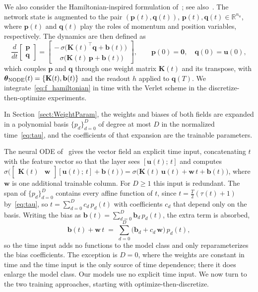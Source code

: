 \documentclass[pdflatex,sn-mathphys-num]{sn-jnl}%
\newcommand{\R}{\mathbb{R}}
\newcommand{\bfu}{\mathbf{u}}
\newcommand{\bfp}{\mathbf{p}}
\newcommand{\bfq}{\mathbf{q}}
\newcommand{\bfb}{\mathbf{b}}
\newcommand{\bfK}{\mathbf{K}}
\newcommand{\bfw}{\mathbf{w}}
\newcommand{\bftheta}{\boldsymbol{\theta}}
\theoremstyle{thmstyleone}%
\theoremstyle{thmstyletwo}%
\theoremstyle{thmstylethree}%
\begin{document}
We also consider the Hamiltonian-inspired formulation of~\cite{HaberRuthotto2017}; see also~\cite{zhong2019symplectic}.
%
The network state is augmented to the pair $(\bfp(t), \bfq(t))$, $\bfp(t),\bfq(t)\in\R^{n_u}$,
where $\bfp(t)$ and $\bfq(t)$ play the roles of momentum and position variables, respectively.
%
The dynamics are then defined as
\begin{equation}\label{eq:f_hamiltonian}
    \frac{d}{dt}
    \begin{bmatrix}
        \bfp \\[4pt] \bfq
    \end{bmatrix}
    =
    \begin{bmatrix}
        -\,\sigma\!\big(\bfK(t)^{\top}\bfq + \bfb(t)\big) \\[4pt]
        \;\;\;\sigma\!\big(\bfK(t)\,\bfp + \bfb(t)\big)
    \end{bmatrix},
    \qquad \bfp(0) = \mathbf{0}, \quad \bfq(0) = \bfu(0),
\end{equation}
which couples $\bfp$ and $\bfq$ through one weight matrix $\bfK(t)$ and its transpose, with $\bftheta_{\rm NODE}(t) = \{\bfK(t), \bfb(t)\}$ and the readout $h$ applied to $\bfq(T)$.
%
We integrate~\eqref{eq:f_hamiltonian} in time with the Verlet scheme in the discretize-then-optimize experiments.


In Section~\ref{sect:WeightParam}, the weights and biases of both fields are expanded in a polynomial basis $\{p_d\}_{d=0}^{D}$ of degree at most $D$ in the normalized time~\eqref{eq:tau}, and the coefficients of that expansion are the trainable parameters.

The neural ODE of~\cite{ChenEtAl2018} gives the vector field an explicit time input, concatenating $t$ with the feature vector so that the layer sees $[\bfu(t);\,t]$ and computes
$\sigma\big(\begin{bmatrix}\bfK(t) & \bfw\end{bmatrix}[\bfu(t);\,t] + \bfb(t)\big) = \sigma\big(\bfK(t)\,\bfu(t) + \bfw\,t + \bfb(t)\big)$,
where $\bfw$ is one additional trainable column.
%
For $D\ge1$ this input is redundant.
%
The span of $\{p_d\}_{d=0}^{D}$ contains every affine function of $t$, since $t = \tfrac{T}{2}(\tau(t)+1)$ by~\eqref{eq:tau}, so $t = \sum_{d=0}^{D} c_d\,p_d(t)$ with coefficients $c_d$ that depend only on the basis.
%
Writing the bias as $\bfb(t) = \sum_{d=0}^{D} \bfb_d\,p_d(t)$, the extra term is absorbed,
\[
\bfb(t) + \bfw\,t \;=\; \sum_{d=0}^{D}\big(\bfb_d + c_d\,\bfw\big)\,p_d(t),
\]
so the time input adds no functions to the model class and only reparameterizes the bias coefficients.
%
The exception is $D=0$, where the weights are constant in time and the time input is the only source of time dependence; there it does enlarge the model class.
%
Our models use no explicit time input.
We now turn to the two training approaches, starting with optimize-then-discretize.
\end{document}
